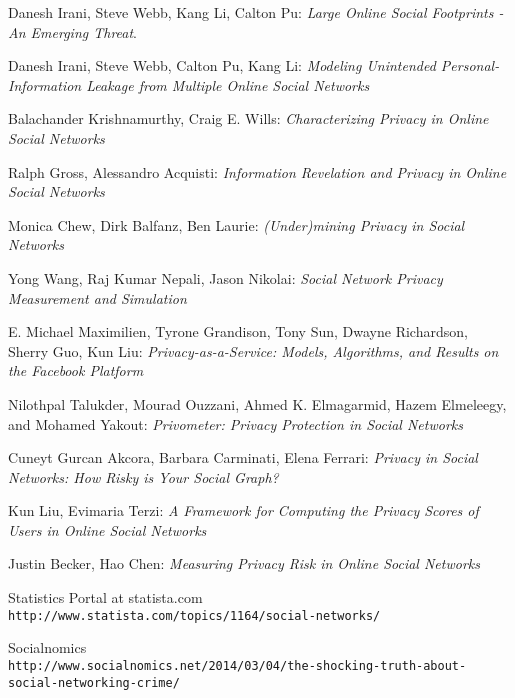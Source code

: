\documentclass[11pt]{article}
\begin{document}
\begin{thebibliography}{9}
Danesh Irani, Steve Webb, Kang Li, Calton Pu: 
\textit{Large Online Social Footprints -An Emerging Threat}. 
 
Danesh Irani, Steve Webb, Calton Pu, Kang Li: 
\textit{Modeling Unintended Personal-Information Leakage from Multiple Online Social Networks}
 
Balachander Krishnamurthy, Craig E. Wills: 
\textit{Characterizing Privacy in Online Social Networks}

Ralph Gross, Alessandro Acquisti: 
\textit{Information Revelation and Privacy in Online Social Networks}

Monica Chew, Dirk Balfanz, Ben Laurie: 
\textit{(Under)mining Privacy in Social Networks}

Yong Wang, Raj Kumar Nepali, Jason Nikolai: 
\textit{Social Network Privacy Measurement and Simulation}

E. Michael Maximilien, Tyrone Grandison, Tony Sun, Dwayne Richardson, Sherry Guo, Kun Liu: 
\textit{Privacy-as-a-Service: Models, Algorithms, and Results on the Facebook Platform}

Nilothpal Talukder, Mourad Ouzzani, Ahmed K. Elmagarmid, Hazem Elmeleegy, and Mohamed Yakout: 
\textit{Privometer: Privacy Protection in Social Networks}

Cuneyt Gurcan Akcora, Barbara Carminati, Elena Ferrari: 
\textit{Privacy in Social Networks: How Risky is Your Social Graph?}

Kun Liu, Evimaria Terzi: 
\textit{A Framework for Computing the Privacy Scores of Users in Online Social Networks}

Justin Becker, Hao Chen: 
\textit{Measuring Privacy Risk in Online Social Networks}

Statistics Portal at statista.com
\\\texttt{http://www.statista.com/topics/1164/social-networks/}

Socialnomics
\\\texttt{http://www.socialnomics.net/2014/03/04/the-shocking-truth-about-social-networking-crime/}

\end{thebibliography}
\end{document}
